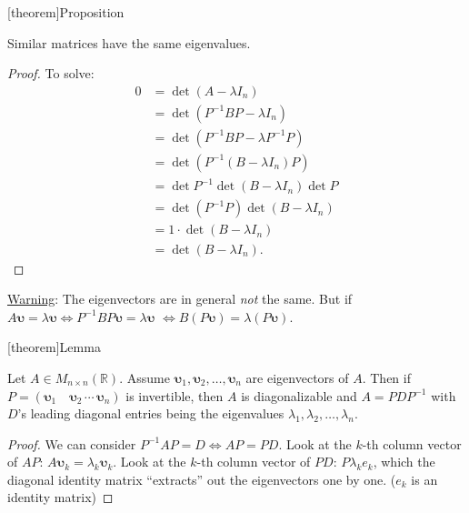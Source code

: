 \documentclass[12pt]{report}
\theoremstyle{definition}
\begin{document}
[theorem]{Proposition}
\begin{similar matrices have the same eigenvalues}
    Similar matrices have the same eigenvalues.
\end{similar matrices have the same eigenvalues}

\begin{proof}
    To solve: \[
        \begin{align*}
            0 & = \det{(A-\lambda I_n)} \\
              & = \det{(P^{-1}BP - \lambda I_n)} \\
              & = \det{(P^{-1}BP - \lambda P^{-1}P)} \\
              & = \det{(P^{-1}(B-\lambda I_n)P)} \\
              & = \det{P^{-1}} \det{(B-\lambda I_n)} \det{P} \\
              & = \det{(P^{-1}P)}\det{(B-\lambda I_n)} \\
              & = 1 \cdot \det{(B-\lambda I_n)} \\
              & = \det{(B-\lambda I_n)}.
        \end{align*}
    \]
\end{proof}

\underline{Warning}: The eigenvectors are in general \emph{not} the same.
But if $A\mathbf{\upsilon} = \lambda \mathbf{\upsilon} \iff P^{-1}BP\mathbf{\upsilon} = \lambda\mathbf{\upsilon}$
$\iff B(P\mathbf{\upsilon}) = \lambda (P\mathbf{\upsilon})$.

[theorem]{Lemma}
\begin{eigenvalues of D}
    Let $A \in M_{n\times n}(\mathbb{R})$. Assume $\mathbf{\upsilon}_1, \mathbf{\upsilon}_2,\ldots,\mathbf{\upsilon}_n$
    are eigenvectors of $A$. Then if $P = (\mathbf{\upsilon}_1 \quad \mathbf{\upsilon}_2 \,\cdots\, \mathbf{\upsilon}_n)$
    is invertible, then $A$ is diagonalizable and $A = PDP^{-1}$ with $D$'s leading
    diagonal entries being the eigenvalues $\lambda_1, \lambda_2, \ldots, \lambda_n$.
\end{eigenvalues of D}

\begin{proof}
    We can consider $P^{-1}AP = D \iff AP = PD$.
    Look at the $k$-th column vector of $AP$: $A\mathbf{\upsilon}_k = \lambda_k \mathbf{\upsilon}_k$.
    Look at the $k$-th column vector of $PD$: $P\lambda_k e_k$, which 
    the diagonal identity matrix ``extracts'' out the eigenvectors one by one.
    ($e_k$ is an identity matrix)
\end{proof}
\end{document}
